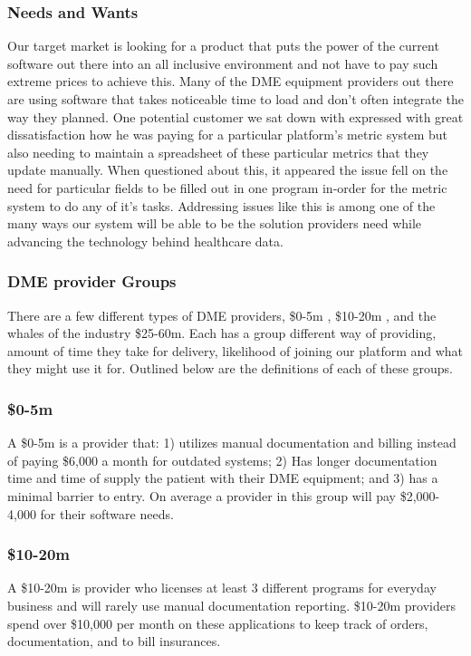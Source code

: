 \documentclass[letterpaper]{article}
\begin{document}
  \subsubsection{Needs and Wants}
  Our target market is looking for a product that puts the power of the current software out there into an all inclusive environment and not have to pay such extreme prices to achieve this. Many of the DME equipment providers out there are using software that takes noticeable time to load and don’t often integrate the way they planned.
%
  One potential customer we sat down with expressed with great dissatisfaction how he was paying for a particular platform’s metric system but also needing to maintain a spreadsheet of these particular metrics that they update manually. When questioned about this, it appeared the issue fell on the need for particular fields to be filled out in one program in-order for the metric system to do any of it’s tasks. Addressing issues like this is among one of the many ways our system will be able to be the solution providers need while advancing the technology behind healthcare data.
%
  \subsubsection{DME provider Groups}
  There are a few different types of DME providers, \$0-5m , \$10-20m , and the whales of the industry \$25-60m. Each has a group different way of providing, amount of time they take for delivery, likelihood of joining our platform and what they might use it for. Outlined below are the definitions of each of these groups.
%
  \subsubsection{\$0-5m}
  A \$0-5m is a provider that: 1) utilizes manual documentation and billing instead of paying \$6,000 a month for outdated systems; 2) Has longer documentation time and time of supply the patient with their DME equipment; and 3) has a minimal barrier to entry. On average a provider in this group will pay \$2,000-4,000 for their software needs.
%
  \subsubsection{\$10-20m}
  A \$10-20m is provider who licenses at least 3 different programs for everyday business and will rarely use manual documentation reporting. \$10-20m providers spend over \$10,000 per month on these applications to keep track of orders, documentation, and to bill insurances.
%
\end{document}
